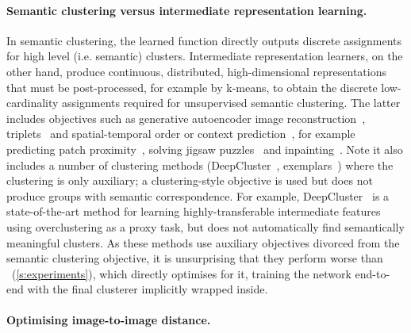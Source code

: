 \paragraph{Semantic clustering versus intermediate representation learning.}
In semantic clustering, the learned function directly outputs discrete assignments for high level (i.e. semantic) clusters. Intermediate representation learners, on the other hand, produce continuous, distributed, high-dimensional representations that must be post-processed, for example by k-means, to obtain the discrete low-cardinality assignments required for unsupervised semantic clustering. The latter includes objectives such as generative autoencoder image reconstruction~\cite{vincent2010stacked},  triplets~\cite{schultz2004learning} and spatial-temporal order or context prediction~\cite{lee2017unsupervised,cruz2017deeppermnet,doersch2015unsupervised}, for example predicting patch proximity~\cite{isola2015learning}, solving jigsaw puzzles~\cite{noroozi2016unsupervised} and inpainting~\cite{pathak2016context}. Note it also includes a number of clustering methods (DeepCluster~\cite{caron2018deep}, exemplars~\cite{dosovitskiy2015discriminative}) where the clustering is only auxiliary; a clustering-style objective is used but does not produce groups with semantic correspondence. For example, DeepCluster~\cite{caron2018deep} is a state-of-the-art method for learning highly-transferable intermediate features using overclustering as a proxy task, but does not automatically find semantically meaningful clusters. As these methods use auxiliary objectives divorced from the semantic clustering objective, it is unsurprising that they perform worse than \methodnameshort~(\cref{s:experiments}), which directly optimises for it, training the network end-to-end with the final clusterer implicitly wrapped inside.




\paragraph{Optimising image-to-image distance.}

